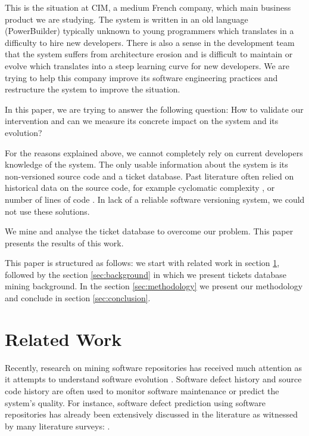 \documentclass[10pt,conference]{IEEEtran}
\begin{document}
This is the situation at CIM, a medium French company, which main business product we are studying.
The system is written in an old language (PowerBuilder) typically unknown to young programmers which translates in a difficulty to hire new developers.
There is also a sense in the development team that the system suffers from architecture erosion and is difficult to maintain or evolve which translates into a steep learning curve for new developers.
We are trying to help this company improve its software engineering practices and restructure the system to improve the situation.


In this paper, we are trying to answer the following question:
How to validate our intervention and can we measure its concrete impact on the system and its evolution?

For the reasons explained above, we cannot completely rely on current developers knowledge of the system.
The only usable information about the system is its non-versioned source code and a ticket database.
Past literature often relied on historical data on the source code, for example
cyclomatic complexity \cite{gill91}, or number of lines of code \cite{port18}.
In lack of a reliable software versioning system, we could not use these solutions.


We mine and analyse the ticket database to overcome our problem.
This paper presents the results of this work.

 This paper is structured as follows: we start with related work in section \ref{sec:related-work}, followed by the section \ref{sec:background} in which we present tickets database mining background. 
 In the section \ref{sec:methodology} we present our methodology and conclude in section \ref{sec:conclusion}.
 
\section{Related Work}
\label{sec:related-work}
Recently, research on mining software repositories has received much attention as it attempts to understand software evolution \cite{Zhan10a}.
Software defect history and source code history are often used to monitor software maintenance or predict the system's quality. 
For instance, software defect prediction using software repositories has already been extensively discussed in the literature as witnessed by many literature surveys: \cite{Catal09,Hall12,Hoss17,Li19a,malh15}.
\end{document}
